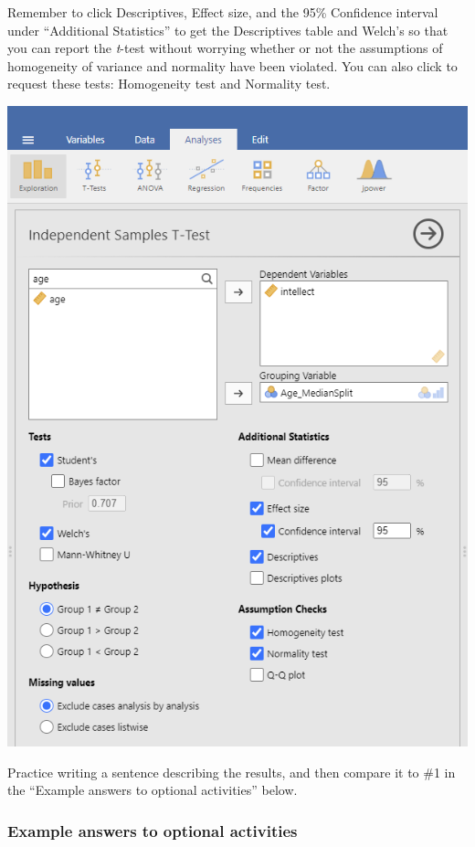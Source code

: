 \documentclass[
]{book}
\begin{document}
Remember to click {Descriptives}, {Effect size}, and the 95\% {Confidence interval} under ``Additional Statistics'' to get the Descriptives table and {Welch's} so that you can report the \emph{t}-test without worrying whether or not the assumptions of homogeneity of variance and normality have been violated. You can also click to request these tests: {Homogeneity test} and {Normality test}.

\includegraphics{img/IndependTTestCommandsInFullForMedSplit.png}

Practice writing a sentence describing the results, and then compare it to \#1 in the ``Example answers to optional activities'' below.

\hypertarget{example-answers-to-optional-activities}{%
\subsubsection{Example answers to optional activities}\label{example-answers-to-optional-activities}}
\end{document}
